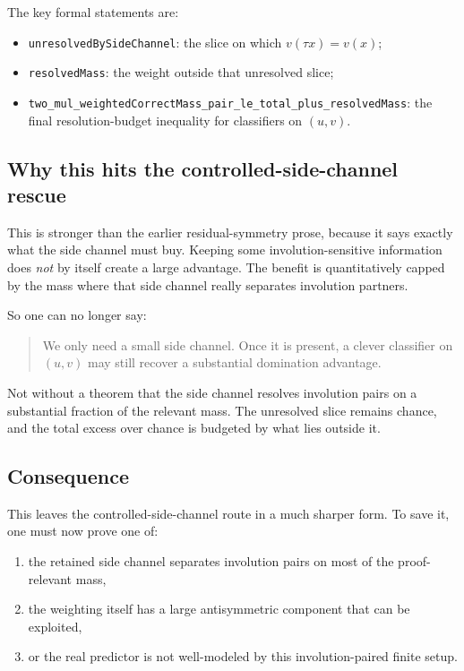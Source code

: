 \documentclass[11pt]{article}
\theoremstyle{remark}
\begin{document}
\noindent
The key formal statements are:
\begin{itemize}[leftmargin=1.5em]
  \item \texttt{unresolvedBySideChannel}: the slice on which \(v(\tau x)=v(x)\);
  \item \texttt{resolvedMass}: the weight outside that unresolved slice;
  \item \texttt{two\_mul\_weightedCorrectMass\_pair\_le\_total\_plus\_resolvedMass}: the final
  resolution-budget inequality for classifiers on \((u,v)\).
\end{itemize}

\subsection{Why this hits the controlled-side-channel rescue}

This is stronger than the earlier residual-symmetry prose, because it says exactly what the side
channel must buy.  Keeping some involution-sensitive information does \emph{not} by itself create a
large advantage.  The benefit is quantitatively capped by the mass where that side channel really
separates involution partners.

So one can no longer say:
\begin{quote}
We only need a small side channel.  Once it is present, a clever classifier on \((u,v)\) may still
recover a substantial domination advantage.
\end{quote}

Not without a theorem that the side channel resolves involution pairs on a substantial fraction of
the relevant mass.  The unresolved slice remains chance, and the total excess over chance is budgeted
by what lies outside it.

\subsection{Consequence}

This leaves the controlled-side-channel route in a much sharper form.  To save it, one must now
prove one of:
\begin{enumerate}[leftmargin=1.5em]
  \item the retained side channel separates involution pairs on most of the proof-relevant mass,
  \item the weighting itself has a large antisymmetric component that can be exploited,
  \item or the real predictor is not well-modeled by this involution-paired finite setup.
\end{enumerate}
\end{document}
